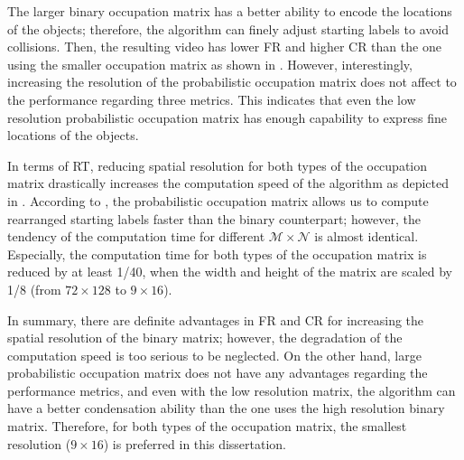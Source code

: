\documentclass[11pt]{hyu_thesis}
\begin{document}
The larger binary occupation matrix has a better ability to encode the locations of the objects; therefore, the algorithm can finely adjust starting labels to avoid collisions. Then, the resulting video has lower FR and higher CR than the one using the smaller occupation matrix as shown in . However, interestingly, increasing the resolution of the probabilistic occupation matrix does not affect to the performance regarding three metrics. This indicates that even the low resolution probabilistic occupation matrix has enough capability to express fine locations of the objects.

In terms of RT, reducing spatial resolution for both types of the occupation matrix drastically increases the computation speed of the algorithm as depicted in . According to , the probabilistic occupation matrix allows us to compute rearranged starting labels faster than the binary counterpart; however, the tendency of the computation time for different $\mathcal{M}\times\mathcal{N}$ is almost identical. Especially, the computation time for both types of the occupation matrix is reduced by at least 1/40, when the width and height of the matrix are scaled by 1/8 (from $72\times128$ to $9\times16$).

In summary, there are definite advantages in FR and CR for increasing the spatial resolution of the binary matrix; however, the degradation of the computation speed is too serious to be neglected. On the other hand, large probabilistic occupation matrix does not have any advantages regarding the performance metrics, and even with the low resolution matrix, the algorithm can have a better condensation ability than the one uses the high resolution binary matrix. Therefore, for both types of the occupation matrix, the smallest resolution ($9\times16$) is preferred in this dissertation.

\tableOccSzOne
{}\tableOccSzTwo
{}\tableOccSzThree
{}\tableOccSzFour
{}\tableOccSzFive

\tableProbOccSzOne
{}\tableProbOccSzTwo
{}\tableProbOccSzThree
{}\tableProbOccSzFour
{}\tableProbOccSzFive
\end{document}

